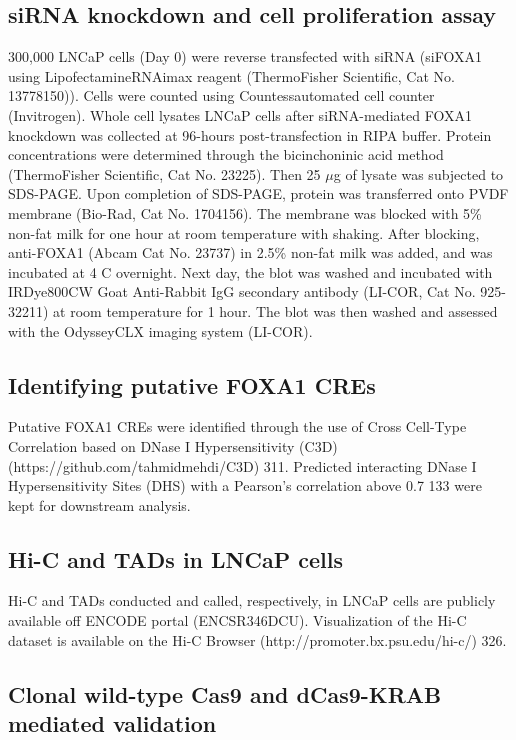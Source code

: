 \subsection{siRNA knockdown and cell proliferation assay}

300,000 LNCaP cells (Day 0) were reverse transfected with siRNA (siFOXA1 using Lipofectamine\textregistered RNAimax reagent (ThermoFisher Scientific, Cat No. 13778150)).
Cells were counted using Countess\texttrademark automated cell counter (Invitrogen).
Whole cell lysates LNCaP cells after siRNA-mediated FOXA1 knockdown was collected at 96-hours post-transfection in RIPA buffer.
Protein concentrations were determined through the bicinchoninic acid method (ThermoFisher Scientific, Cat No. 23225).
Then 25 $\mu$g of lysate was subjected to SDS-PAGE.
Upon completion of SDS-PAGE, protein was transferred onto PVDF membrane (Bio-Rad, Cat No. 1704156).
The membrane was blocked with 5\% non-fat milk for one hour at room temperature with shaking.
After blocking, anti-FOXA1 (Abcam Cat No. 23737) in 2.5\% non-fat milk was added, and was incubated at 4 \textdegree C overnight.
Next day, the blot was washed and incubated with IRDye\textregistered 800CW Goat Anti-Rabbit IgG secondary antibody (LI-COR, Cat No. 925-32211) at room temperature for 1 hour.
The blot was then washed and assessed with the Odyssey\textregistered CLX imaging system (LI-COR).

\subsection{Identifying putative FOXA1 CREs}

Putative FOXA1 CREs were identified through the use of Cross Cell-Type Correlation based on DNase I Hypersensitivity (C3D) (https://github.com/tahmidmehdi/C3D) 311.
Predicted interacting DNase I Hypersensitivity Sites (DHS) with a Pearson's correlation above 0.7 133 were kept for downstream analysis.

\subsection{Hi-C and TADs in LNCaP cells}

Hi-C and TADs conducted and called, respectively, in LNCaP cells are publicly available off ENCODE portal (ENCSR346DCU).
Visualization of the Hi-C dataset is available on the Hi-C Browser (http://promoter.bx.psu.edu/hi-c/) 326.

\subsection{Clonal wild-type Cas9 and dCas9-KRAB mediated validation}

